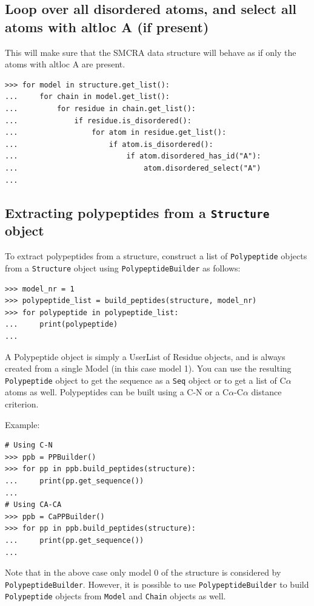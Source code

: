 \subsection*{Loop over all disordered atoms, and select all atoms with altloc A (if present)}
This will make sure that the SMCRA data structure will behave as if only the
atoms with altloc A are present.

\begin{verbatim}
>>> for model in structure.get_list():
...     for chain in model.get_list():
...         for residue in chain.get_list():
...             if residue.is_disordered():
...                 for atom in residue.get_list():
...                     if atom.is_disordered():
...                         if atom.disordered_has_id("A"):
...                             atom.disordered_select("A")
...
\end{verbatim}

\subsection*{Extracting polypeptides from a \texttt{Structure} object}

To extract polypeptides from a structure, construct a list of \texttt{Polypeptide} objects from a \texttt{Structure} object using \texttt{PolypeptideBuilder} as follows:

\begin{verbatim}
>>> model_nr = 1
>>> polypeptide_list = build_peptides(structure, model_nr)
>>> for polypeptide in polypeptide_list:
...     print(polypeptide)
...
\end{verbatim}

A Polypeptide object is simply a UserList of Residue objects, and is always created from a single Model (in this case model 1).
You can use the resulting \texttt{Polypeptide} object to get the sequence as a \texttt{Seq} object or to get a list of C$\alpha$ atoms as well. Polypeptides can be built using a C-N or a C$\alpha$-C$\alpha$ distance criterion.

Example:

\begin{verbatim}
# Using C-N
>>> ppb = PPBuilder()
>>> for pp in ppb.build_peptides(structure):
...     print(pp.get_sequence())
...
# Using CA-CA
>>> ppb = CaPPBuilder()
>>> for pp in ppb.build_peptides(structure):
...     print(pp.get_sequence())
...
\end{verbatim}
Note that in the above case only model 0 of the structure is considered
by \texttt{PolypeptideBuilder}. However, it is possible to use \texttt{PolypeptideBuilder}
to build \texttt{Polypeptide} objects from \texttt{Model} and \texttt{Chain}
objects as well.

